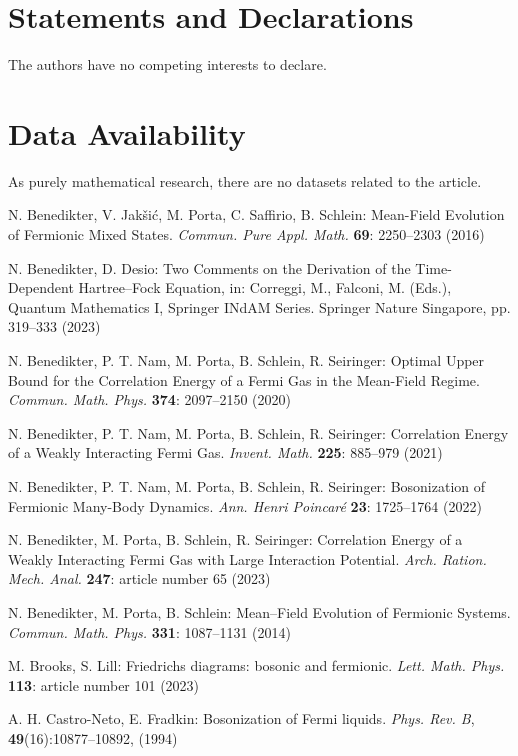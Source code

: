 \documentclass[12pt,a4paper]{article}
\numberwithin{equation}{section}
\newcommand{\1}{\mathbb{I}}
\theoremstyle{plain}
\theoremstyle{definition}
\theoremstyle{remark}
\theoremstyle{plain}
\theoremstyle{definition}
\theoremstyle{remark}
\begin{document}
\section*{Statements and Declarations}
The authors have no competing interests to declare.

\section*{Data Availability}
As purely mathematical research, there are no datasets related to the article.

\begin{thebibliography}{29}
N. Benedikter, V. Jakšić, M. Porta, C. Saffirio, B. Schlein:
	Mean-Field Evolution of Fermionic Mixed States.
	\emph{Commun. Pure Appl. Math.} \textbf{69}: 2250--2303 (2016)

N. Benedikter, D. Desio:
	Two Comments on the Derivation of the Time-Dependent Hartree–Fock Equation, in: Correggi, M., Falconi, M. (Eds.), Quantum Mathematics I, Springer INdAM Series. Springer Nature Singapore, pp. 319--333 (2023)

N. Benedikter, P. T. Nam, M. Porta, B. Schlein, R. Seiringer:
	Optimal Upper Bound for the Correlation Energy of a Fermi Gas in the Mean-Field Regime.
	\emph{Commun. Math. Phys.} {\bf 374}: 2097--2150 (2020)

N. Benedikter, P. T. Nam, M. Porta, B. Schlein, R. Seiringer:
	Correlation Energy of a Weakly Interacting Fermi Gas.
	\emph{Invent. Math.} {\bf 225}: 885--979 (2021)
	
N. Benedikter, P. T. Nam, M. Porta, B. Schlein, R. Seiringer:
	Bosonization of Fermionic Many-Body Dynamics.
	\emph{Ann. Henri Poincar\'e} {\bf 23}: 1725--1764 (2022)

N. Benedikter, M. Porta, B. Schlein, R. Seiringer:
	Correlation Energy of a Weakly Interacting Fermi Gas with Large Interaction Potential.
	\emph{Arch. Ration. Mech. Anal.} \textbf{247}: article number 65 (2023)

N. Benedikter, M. Porta, B. Schlein:
	Mean–Field Evolution of Fermionic Systems.
	\emph{Commun. Math. Phys.} \textbf{331}: 1087--1131 (2014)

M. Brooks, S. Lill:
	Friedrichs diagrams: bosonic and fermionic.
	\emph{Lett. Math. Phys.} {\bf 113}: article number 101 (2023)


A. H. Castro-Neto, E. Fradkin:
	Bosonization of {{Fermi}} liquids.
	\emph{Phys. Rev. B}, \textbf{49}(16):10877--10892, (1994)


\end{thebibliography}
\end{document}
